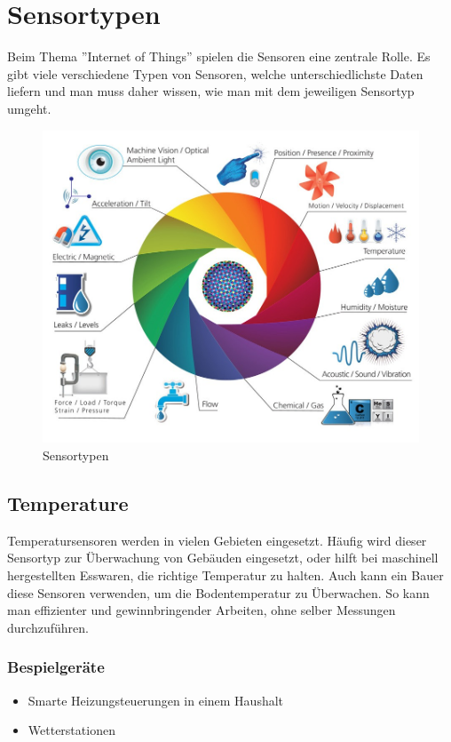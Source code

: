 \section{Sensortypen}
Beim Thema ''Internet of Things'' spielen die Sensoren eine zentrale Rolle. Es gibt viele verschiedene Typen von Sensoren, welche unterschiedlichste Daten liefern und man muss daher wissen, wie man mit dem jeweiligen Sensortyp umgeht. 
\begin{figure}[H]
\centering
\includegraphics[scale=0.35]{images/sensors.jpg}
\caption{Sensortypen\cite{SensorImage}}
\end{figure}


\subsection{Temperature}%
Temperatursensoren werden in vielen Gebieten eingesetzt. Häufig wird dieser Sensortyp zur Überwachung von Gebäuden eingesetzt, oder hilft bei maschinell hergestellten Esswaren, die richtige Temperatur zu halten. Auch kann ein Bauer diese Sensoren verwenden, um die Bodentemperatur zu Überwachen. So kann man effizienter und gewinnbringender Arbeiten, ohne selber Messungen durchzuführen.
\subsubsection{Bespielgeräte}
\begin{itemize}
\item	Smarte Heizungsteuerungen in einem Haushalt
\item	Wetterstationen
\end{itemize}


